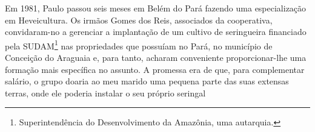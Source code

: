 Em 1981, Paulo passou seis meses em Belém do Pará fazendo uma especialização em Heveicultura.
Os irmãos Gomes dos Reis, associados da cooperativa, convidaram-no a gerenciar a implantação de um cultivo de seringueira financiado pela SUDAM\footnote{Superintendência do Desenvolvimento da Amazônia, uma autarquia.} nas propriedades que possuíam no Pará, no município de Conceição do Araguaia e, para tanto, acharam conveniente proporcionar-lhe uma formação mais específica no assunto.
A promessa era de que, para complementar salário, o grupo doaria ao meu marido uma pequena parte das suas extensas terras, onde ele poderia instalar o seu próprio seringal
